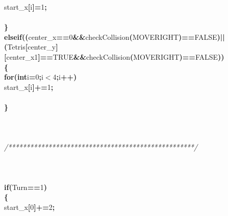 \documentclass[a4paper, 10pt]{article}
\newcommand\SPC{\hspace*{0.6em}}
\newcommand\HYP{\mbox{\char 45}}
\newcommand{\CppAComment}[1]{\textit{\textcolor[rgb]{0.2,0.6,1}{#1}}}
\newcommand{\CppAIdentifier}[1]{#1}
\newcommand{\CppANumber}[1]{\textcolor[rgb]{0.5,0,0.5}{#1}}
\newcommand{\CppAReservedWord}[1]{\textbf{#1}}
\newcommand{\CppASpace}[1]{\colorbox[rgb]{1,1,1}{#1}}
\newcommand{\CppASymbol}[1]{\textbf{\textcolor[rgb]{1,0,0}{#1}}}
\begin{document}
\begin{ttfamily}
\CppASpace{\SPC \SPC \SPC \SPC \SPC \SPC }\CppAIdentifier{start\_x}\CppASymbol{[}\CppAIdentifier{i}\CppASymbol{]}\CppASymbol{\HYP =}\CppANumber{1}\CppASymbol{;}\\
\\
\CppASpace{\SPC \SPC \SPC \SPC }\CppASymbol{\}}\\
\CppASpace{\SPC \SPC \SPC \SPC }\CppAReservedWord{else}\CppASpace{\SPC }\CppAReservedWord{if}\CppASymbol{(}\CppASymbol{(}\CppAIdentifier{center\_x}\CppASymbol{==}\CppANumber{0}\CppASpace{\SPC }\CppASymbol{\&\&}\CppASpace{\SPC }\CppAIdentifier{checkCollision}\CppASymbol{(}\CppAIdentifier{MOVERIGHT}\CppASymbol{)}\CppASymbol{==}\CppAIdentifier{FALSE}\CppASymbol{)}\CppASpace{\SPC }\CppASymbol{||}\CppASpace{\SPC }\CppASymbol{(}\CppAIdentifier{Tetris}\CppASymbol{[}\CppAIdentifier{center\_y}\CppASymbol{]}\CppASymbol{[}\CppAIdentifier{center\_x}\CppASymbol{\HYP }\CppANumber{1}\CppASymbol{]}\CppASymbol{==}\CppAIdentifier{TRUE}\CppASymbol{\&\&}\CppAIdentifier{checkCollision}\CppASymbol{(}\CppAIdentifier{MOVERIGHT}\CppASymbol{)}\CppASymbol{==}\CppAIdentifier{FALSE}\CppASymbol{)}\CppASymbol{)}\\
\CppASpace{\SPC \SPC \SPC \SPC }\CppASymbol{\{}\\
\CppASpace{\SPC \SPC \SPC \SPC \SPC }\CppAReservedWord{for}\CppASymbol{(}\CppAReservedWord{int}\CppASpace{\SPC }\CppAIdentifier{i}\CppASymbol{=}\CppANumber{0}\CppASymbol{;}\CppAIdentifier{i}\CppASymbol{$<$}\CppANumber{4}\CppASymbol{;}\CppAIdentifier{i}\CppASymbol{++}\CppASymbol{)}\\
\CppASpace{\SPC \SPC \SPC \SPC \SPC \SPC }\CppAIdentifier{start\_x}\CppASymbol{[}\CppAIdentifier{i}\CppASymbol{]}\CppASymbol{+=}\CppANumber{1}\CppASymbol{;}\\
\\
\CppASpace{\SPC \SPC \SPC \SPC }\CppASymbol{\}}\\
\\
\\
\\
\CppASpace{\SPC \SPC \SPC }\CppAComment{/***************************************************/}\\
\\
\\
\\
\CppASpace{\SPC \SPC \SPC \SPC }\CppAReservedWord{if}\CppASymbol{(}\CppAIdentifier{Turn}\CppASymbol{==}\CppANumber{1}\CppASymbol{)}\\
\CppASpace{\SPC \SPC \SPC \SPC }\CppASymbol{\{}\\
\CppASpace{\SPC \SPC \SPC \SPC \SPC }\CppAIdentifier{start\_x}\CppASymbol{[}\CppANumber{0}\CppASymbol{]}\CppASymbol{+=}\CppANumber{2}\CppASymbol{;}\\

\end{ttfamily}
\end{document}
